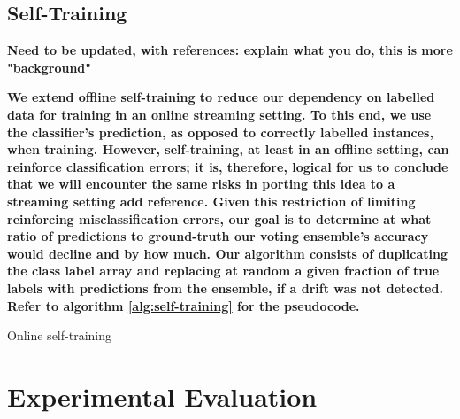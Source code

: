 \documentclass[runningheads]{llncs}
\begin{document}
\subsection{Self-Training}

{\bf{Need to be updated, with references: explain what you do, this is more "background"}}

{\bf{We extend offline self-training to reduce our dependency on labelled data for training in an online streaming setting. To this end, we use the classifier's prediction, as opposed to correctly labelled instances, when training.
However, self-training, at least in an offline setting, can reinforce classification errors; it is, therefore, logical for us to conclude that we will encounter the same risks in porting this idea to a streaming setting {\bf{add reference}}. Given this restriction of limiting reinforcing misclassification errors, our goal is to determine at what ratio of predictions to ground-truth our voting ensemble's accuracy would decline and by how much.
Our algorithm consists of duplicating the class label array and replacing at random a given fraction of true labels with predictions from the ensemble, if a drift was not detected. Refer to algorithm \ref{alg:self-training} for the pseudocode.}}

\begin{algorithm}

\caption{\label{alg:self-training}Online self-training}
\end{algorithm}

\section{Experimental Evaluation\label{section:experimental_design}}
\end{document}
